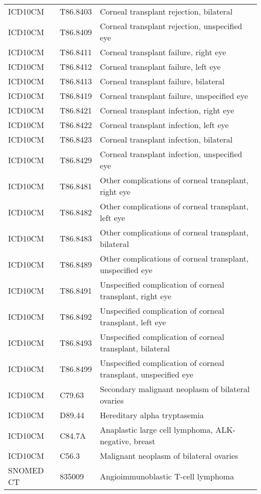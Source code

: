 \begin{table}[ht]
\begin{tabular}{lll}
  ICD10CM & T86.8403 & Corneal transplant rejection, bilateral \\ 
  ICD10CM & T86.8409 & Corneal transplant rejection, unspecified eye \\ 
  ICD10CM & T86.8411 & Corneal transplant failure, right eye \\ 
  ICD10CM & T86.8412 & Corneal transplant failure, left eye \\ 
  ICD10CM & T86.8413 & Corneal transplant failure, bilateral \\ 
  ICD10CM & T86.8419 & Corneal transplant failure, unspecified eye \\ 
  ICD10CM & T86.8421 & Corneal transplant infection, right eye \\ 
  ICD10CM & T86.8422 & Corneal transplant infection, left eye \\ 
  ICD10CM & T86.8423 & Corneal transplant infection, bilateral \\ 
  ICD10CM & T86.8429 & Corneal transplant infection, unspecified eye \\ 
  ICD10CM & T86.8481 & Other complications of corneal transplant, right eye \\ 
  ICD10CM & T86.8482 & Other complications of corneal transplant, left eye \\ 
  ICD10CM & T86.8483 & Other complications of corneal transplant, bilateral \\ 
  ICD10CM & T86.8489 & Other complications of corneal transplant, unspecified eye \\ 
  ICD10CM & T86.8491 & Unspecified complication of corneal transplant, right eye \\ 
  ICD10CM & T86.8492 & Unspecified complication of corneal transplant, left eye \\ 
  ICD10CM & T86.8493 & Unspecified complication of corneal transplant, bilateral \\ 
  ICD10CM & T86.8499 & Unspecified complication of corneal transplant, unspecified eye \\ 
  ICD10CM & C79.63 & Secondary malignant neoplasm of bilateral ovaries \\ 
  ICD10CM & D89.44 & Hereditary alpha tryptasemia \\ 
  ICD10CM & C84.7A & Anaplastic large cell lymphoma, ALK-negative, breast \\ 
  ICD10CM & C56.3 & Malignant neoplasm of bilateral ovaries \\ 
  SNOMED CT & 835009 & Angioimmunoblastic T-cell lymphoma \\ 

\end{tabular}
\end{table}
